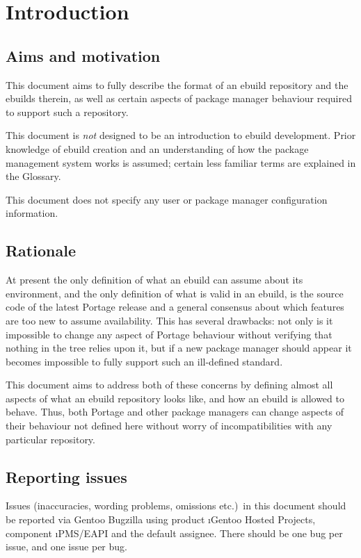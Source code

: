 \chapter{Introduction}

\section{Aims and motivation}

This document aims to fully describe the format of an ebuild repository and the ebuilds therein, as
well as certain aspects of package manager behaviour required to support such a repository.

This document is \emph{not} designed to be an introduction to ebuild development. Prior knowledge of
ebuild creation and an understanding of how the package management system works is assumed; certain
less familiar terms are explained in the Glossary.

This document does not specify any user or package manager configuration information.

\section{Rationale}

At present the only definition of what an ebuild can assume about its environment, and the only
definition of what is valid in an ebuild, is the source code of the latest Portage release and
a general consensus about which features are too new to assume availability. This has several
drawbacks: not only is it impossible to change any aspect of Portage behaviour without verifying
that nothing in the tree relies upon it, but if a new package manager should appear it becomes
impossible to fully support such an ill-defined standard.

This document aims to address both of these concerns by defining almost all aspects of what an
ebuild repository looks like, and how an ebuild is allowed to behave. Thus, both Portage and other
package managers can change aspects of their behaviour not defined here without worry of
incompatibilities with any particular repository.

\section{Reporting issues}

Issues (inaccuracies, wording problems, omissions etc.)\ in this document should be reported via
Gentoo Bugzilla using product \i{Gentoo Hosted Projects}, component \i{PMS/EAPI} and the default
assignee. There should be one bug per issue, and one issue per bug.

